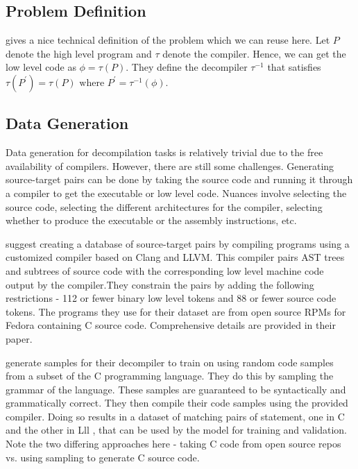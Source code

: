 \documentclass{article}
\begin{document}
\subsection{Problem Definition}
\citet{coda} gives a nice technical definition of the problem which we can reuse here. Let $P$ denote the high level program and $\tau$ denote the compiler. Hence, we can get the low level code as $\phi = \tau(P)$. They define the decompiler $\tau^{-1}$ that satisfies $\tau(P^{'}) = \tau(P) \text{ where } P^{'} = \tau^{-1}(\phi)$.

\subsection{Data Generation}
Data generation for decompilation tasks is relatively trivial due to the free availability of compilers. However, there are still some challenges. Generating source-target pairs can be done by taking the source code and running it through a compiler to get the executable or low level code. Nuances involve selecting the source code, selecting the different architectures for the compiler, selecting whether to produce the executable or the assembly instructions, etc. 

\citet{katz2018using} suggest creating a database of source-target pairs by compiling programs using a customized compiler based on Clang and LLVM. This compiler pairs AST trees and subtrees of source code with the corresponding low level machine code output by the compiler.They constrain the pairs by adding the following restrictions - 112 or fewer binary low level tokens and 88 or fewer source code tokens. The programs they use for their dataset are from open source RPMs for Fedora containing C source code. Comprehensive details are provided in their paper.

\citet{katz2019towards} generate samples for their decompiler to train on using random code samples from a subset of the C programming language. They do this by sampling the grammar of the language. These samples are guaranteed to be syntactically and grammatically correct. They then compile their code samples using the provided compiler. Doing so results in a dataset of matching pairs of statement, one in C and the other in Lll , that can be used by the model for training and validation. Note the two differing approaches here - taking C code from open source repos vs. using sampling to generate C source code. 
\end{document}
